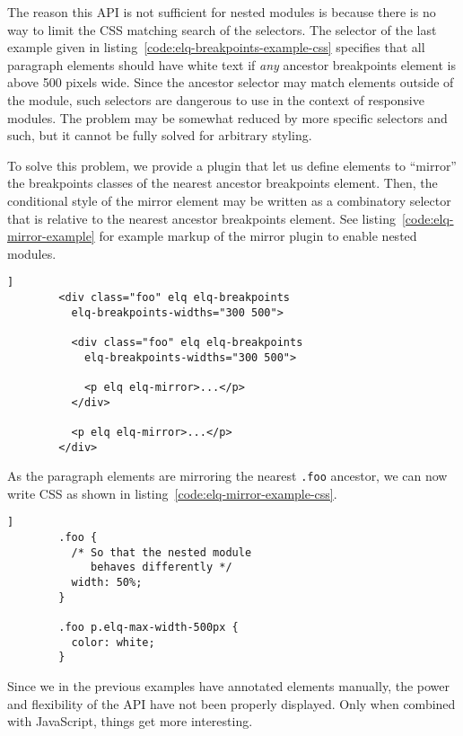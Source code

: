 \documentclass{acm_proc_article-sp}
\newcommand{\code}[1]{\texttt{#1}}
\begin{document}
      The reason this API is not sufficient for nested modules is because there is no way to limit the CSS matching search of the selectors.
      The selector of the last example given in listing~\ref{code:elq-breakpoints-example-css} specifies that all paragraph elements should have white text if \emph{any} ancestor breakpoints element is above 500 pixels wide.
      Since the ancestor selector may match elements outside of the module, such selectors are dangerous to use in the context of responsive modules.
      The problem may be somewhat reduced by more specific selectors and such, but it cannot be fully solved for arbitrary styling.

      To solve this problem, we provide a plugin that let us define elements to ``mirror'' the breakpoints classes of the nearest ancestor breakpoints element.
      Then, the conditional style of the mirror element may be written as a combinatory selector that is relative to the nearest ancestor breakpoints element.
      See listing~\ref{code:elq-mirror-example} for example markup of the mirror plugin to enable nested modules.

      \begin{lstlisting}[gobble=8,caption={},captionpos=b,label={code:elq-mirror-example}]]
        <div class="foo" elq elq-breakpoints
          elq-breakpoints-widths="300 500">
          
          <div class="foo" elq elq-breakpoints
            elq-breakpoints-widths="300 500">

            <p elq elq-mirror>...</p>
          </div>

          <p elq elq-mirror>...</p>
        </div>
      \end{lstlisting}

      As the paragraph elements are mirroring the nearest \code{.foo} ancestor, we can now write CSS as shown in listing~\ref{code:elq-mirror-example-css}.

      \begin{lstlisting}[gobble=8,caption={},captionpos=b,label={code:elq-mirror-example-css}]]
        .foo {
          /* So that the nested module 
             behaves differently */
          width: 50%;
        }

        .foo p.elq-max-width-500px {
          color: white;
        }
      \end{lstlisting}

      Since we in the previous examples have annotated elements manually, the power and flexibility of the API have not been properly displayed.
      Only when combined with JavaScript, things get more interesting.
\end{document}
